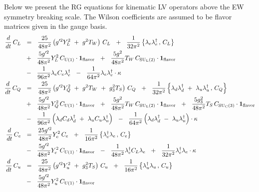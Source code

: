 \documentclass[12pt,preprintnumbers,nofootinbib]{revtex4}
\newcommand{\suc}{{{\rm SU}_{\rm C}(3)}}
\newcommand{\sul}{{{\rm SU}_{\rm L}(2)}}
\newcommand{\ue}{{{\rm U}(1)}}
\newcommand{\uflavor}{\mathbf{1}_{\rm flavor}}
\begin{document}
	Below we present the RG equations for kinematic LV operators above the EW
	symmetry breaking scale. 
	The Wilson coefficients are assumed to be flavor matrices given in the gauge basis.
\begin{align}
\label{RG_above_ferm}
\notag
	\frac{d}{dt}\, 
	C_L
	&
	~~=~~
	\frac{25}{48\pi^2}
	\left(
		g'^2 Y_L^2  ~+~
		g^2 T_W 
	\right)\, C_L 
	~~+~~
	\frac{1}{32\pi^2} 
		\left\{ \lambda_e\lambda_e^\dag\,,\, C_L \right\}
	\\
\notag
	&
	~~+~~
	\frac{5 g'^2}{48\pi^2}  Y_L^2\, C_\ue \cdot \uflavor
	~~+~~
	\frac{5 g^2}{48\pi^2} T_W\, C_\sul \cdot \uflavor
	\\
\notag 
	&
	~~-~~
	\frac{1}{96\pi^2} \lambda_e C_e \lambda_e^\dag 
	~~-~~
	\frac{1}{64\pi^2} \lambda_e \lambda_e^\dag \cdot \kappa
	\\
\notag
	\frac{d}{dt}\, 
	C_Q
	&
	~~=~~
	\frac{25}{48\pi^2}
	\left(
		g'^2 Y_Q^2 ~+~
		g^2 T_W ~+~
		g_3^2 T_S
	\right)\,
	C_Q
	~~+~~
	\frac{1}{32\pi^2} 
	\left\{ \lambda_d \lambda_d^\dag ~+~
		\lambda_u \lambda_u^\dag \,,\,
		C_Q 
	\right\}
	\\
\notag
	&
	~~+~~
	\frac{5 g'^2}{48\pi^2} Y_Q^2\, C_\ue \cdot \uflavor 
	~~+~~ 
	\frac{5 g^2}{48\pi^2} T_W\, C_\sul \cdot \uflavor 
	~~+~~
	\frac{5 g_3^2}{48\pi^2} T_S\, C_\suc \cdot \uflavor
	\\
\notag
	&
	~~-~~
	\frac{1}{96\pi^2}
	\left( \lambda_d C_d \lambda_d^\dag ~+~
		\lambda_u C_u \lambda_u^\dag 
	\right)
	~~-~~
	\frac{1}{64\pi^2}
	\left( \lambda_d \lambda_d^\dag ~-~
		\lambda_u \lambda_u^\dag 
	\right) \cdot
	\kappa
	\\
	\frac{d}{dt}\, 
	C_e
	&
	~~=~~
	\frac{25 g'^2}{48\pi^2} Y_e^2\, C_e
	~~+~~
	\frac{1}{16\pi^2} 
	\left\{ \lambda_e^\dag \lambda_e \,,\,
		C_e 
	\right\}
	\\
\notag
	&
	~~-~~
	\frac{5 g'^2}{48\pi^2} Y_e^2\, C_\ue \cdot \uflavor
	~~-~~
	\frac{1}{48\pi^2} \lambda_e^\dag C_L \lambda_e
	~~+~~
	\frac{1}{32\pi^2} \lambda_e^\dag \lambda_e \cdot
	\kappa
	\\
\notag
	\frac{d}{dt}\, 
	C_u
	&
	~~=~~
	\frac{25}{48\pi^2} 
	\left(
	g'^2 Y_u^2 ~+~ g_3^2 T_S 
	\right)\, C_u
	~~+~~
	\frac{1}{16\pi^2} 
	\left\{ \lambda_u^\dag \lambda_u \,,\, C_u 
	\right\}
	\\
\notag
	&
	~~-~~
	\frac{5 g'^2}{48\pi^2} Y_u^2\, C_\ue \cdot \uflavor

\end{align}
\end{document}
